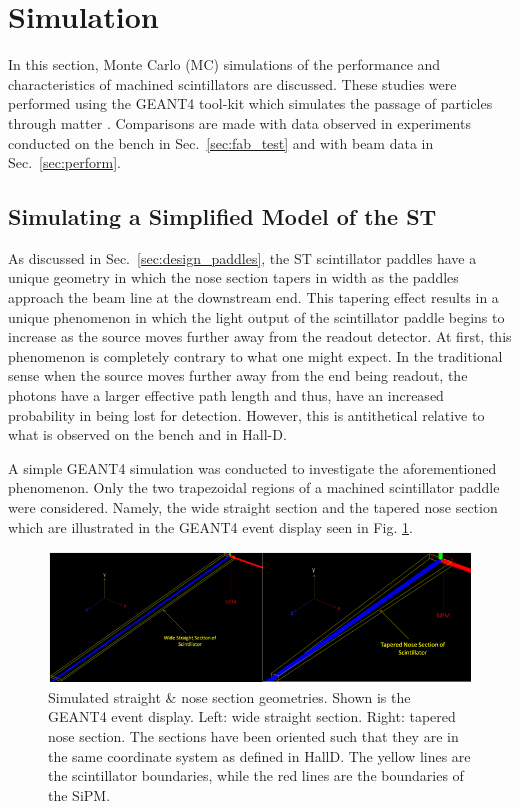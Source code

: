 \section{Simulation} \label{sec:sim}

In this section,  Monte Carlo (MC) simulations of the performance and characteristics of machined scintillators  are discussed.  These  studies were performed using the GEANT4 tool-kit which simulates the passage of particles through matter \cite{geant4_website}.  Comparisons are made with data observed in experiments conducted on the bench in Sec.~\ref{sec:fab_test} and with beam data in Sec.~\ref{sec:perform}.  

%
%

\subsection{Simulating a Simplified Model of the ST} \label{sec:sim_simple}

As discussed in Sec.~\ref{sec:design_paddles}, the ST scintillator paddles have a unique geometry in which the nose section tapers in width as the paddles approach the beam line at the downstream end.  This tapering effect results in a unique phenomenon in which the light output of the scintillator paddle begins to increase as the source moves further away from the readout detector.  At first, this phenomenon is completely contrary to what one might expect. In the traditional sense when the source moves further away from the end being readout, the photons have a larger effective path length and thus, have an increased probability in being lost for detection.  However, this is antithetical relative to what is observed on the bench and in Hall-D.

A simple GEANT4 simulation was conducted to investigate the aforementioned phenomenon. Only the two trapezoidal regions of a machined scintillator paddle were considered.  Namely, the wide straight section and the tapered nose section which are illustrated in the GEANT4 event display  seen in Fig. \ref{fig:beam_off}.
	\begin{figure}[!htb]
	\centering
	\includegraphics[width=1.0\columnwidth]{simulation/figs/beam_off}
	\caption{Simulated straight \& nose section geometries.  Shown is the GEANT4 event display.  Left: wide straight section.  Right: tapered nose section.  The sections have been oriented such that they are in the same coordinate system as defined in HallD.  The yellow lines are the scintillator boundaries, while the red lines are the boundaries of the SiPM.}
	\label{fig:beam_off}
	\end{figure}  

